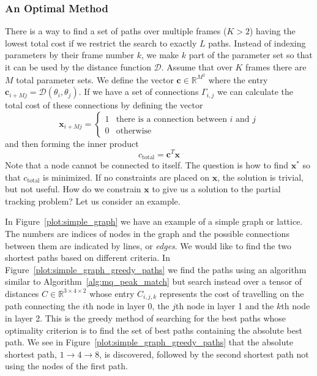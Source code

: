 \documentclass[letterpaper,12pt]{report}
\begin{document}
\subsubsection{An Optimal Method}

There is a way to find a set of paths over multiple frames ($K > 2$) having the
lowest total cost if
we restrict the search to exactly $L$ paths. Instead of indexing parameters by
their frame number $k$, we make $k$ part of the parameter set so that it can be
used by the distance function $\mathcal{D}$. Assume that over $K$ frames there
are $M$ total parameter sets. We define the vector $\boldsymbol{c} \in \mathbb{R}^{M^2}$
where the entry $\boldsymbol{c}_{i + Mj} = \mathcal{D} \left( \theta_{i}, \theta_{j}
\right)$. If we have a set of connections $\Gamma_{i,j}$ we can calculate the
total cost of these connections by defining the vector
\[
    \boldsymbol{x}_{i + Mj} = \begin{cases}
        1 & \text{there is a connection between }i\text{ and }j\\
        0 & \text{otherwise}
    \end{cases}
\]
and then forming the inner product
\[
    c_{\text{total}}=\boldsymbol{c}^{T}\boldsymbol{x}
\]
Note that a node cannot be connected to itself. The question is how to find
$\boldsymbol{x}^{\ast}$ so that $c_{\text{total}}$ is minimized. If no
constraints are placed on $\boldsymbol{x}$, the solution is trivial, but not
useful. How do we constrain $\boldsymbol{x}$ to give us a solution to the
partial tracking problem? Let us consider an example.

In Figure~\ref{plot:simple_graph} we have an example of a simple graph or
lattice. The numbers are indices of nodes in the graph and the possible
connections between them are indicated by lines, or \textit{edges}. We would like to find the two
shortest paths based on different criteria. In
Figure~\ref{plot:simple_graph_greedy_paths} we find the paths using an algorithm
similar to Algorithm~\ref{alg:mq_peak_match} but search instead over a tensor
of distances $C \in \mathbb{R}^{3 \times 4 \times 2}$ whose entry $C_{i,j,k}$
represents the cost of travelling on the path connecting the $i$th node in layer
0, the $j$th node in layer 1 and the $k$th node in layer 2. This is the greedy
method of searching for the best paths whose optimality criterion is to find the
set of best paths containing the absolute best path. We see in
Figure~\ref{plot:simple_graph_greedy_paths} that the absolute shortest path, $1
\rightarrow 4 \rightarrow 8$, is discovered, followed by the second shortest
path not using the nodes of the first path.
\end{document}
